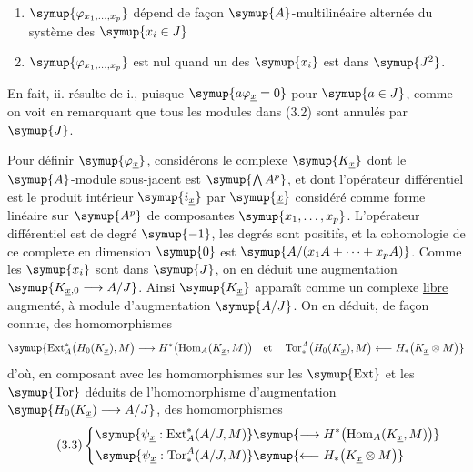 \begin{enumerate}
\item[\textup{i.}] $\symup{\varphi_{x_1,\ldots,x_p}}$ dépend de façon
$\symup{A}$-multilinéaire alternée du système des $\symup{x_i\in J}$
\item[\textup{ii.}] $\symup{\varphi_{x_1,\ldots,x_p}}$ est nul quand un des $\symup{x_i}$ est
dans $\symup{J^{2}}$.
\end{enumerate}
En fait, ii. résulte de i., puisque $\symup{a\varphi_{\underline{x}}=0}$ pour $\symup{a\in J}$,
comme on voit en remarquant que tous les modules dans (3.2) sont annulés par
$\symup{J}$.

Pour définir $\symup{\varphi_{\underline{x}}}$, considérons le complexe
$\symup{K_{\underline{x}}}$ dont le $\symup{A}$-module sous-jacent est $\symup{\bigwedge A^{p}}$, et
dont l'opérateur différentiel est le produit intérieur $\symup{i_{\underline{x}}}$ par
$\symup{\underline{x}}$ considéré comme forme linéaire sur $\symup{A^{p}}$ de composantes
$\symup{x_1,\ldots,x_p}$. L'opérateur différentiel est de degré $\symup{-1}$, les degrés sont
positifs, et la cohomologie de ce complexe en dimension $\symup{0}$ est
$\symup{A/(x_1A+\cdots+x_pA)}$. Comme les $\symup{x_i}$ sont dans $\symup{J}$, on en déduit une
augmentation $\symup{K_{\underline{x},0}\longrightarrow A/J}$. Ainsi
$\symup{K_{\underline{x}}}$ apparaît comme un complexe \uline{libre} augmenté, à module
d'augmentation $\symup{A/J}$. On en déduit, de façon connue, des homomorphismes
\[
\symup{\operatorname{Ext}_{A}^{*}\bigl(H_0(K_{\underline{x}}),M\bigr)
\longrightarrow
H^{*}\bigl(\operatorname{Hom}_{A}(K_{\underline{x}},M)\bigr)\quad\text{et}\quad
\operatorname{Tor}_{*}^{A}\bigl(H_0(K_{\underline{x}}),M\bigr)
\longleftarrow
H_{*}\bigl(K_{\underline{x}}\otimes M\bigr)}
\]
d'où, en composant avec les homomorphismes sur les $\symup{\operatorname{Ext}}$ et les
$\symup{\operatorname{Tor}}$ déduits de l'homomorphisme d'augmentation
$\symup{H_0(K_{\underline{x}})\longrightarrow A/J}$, des homomorphismes
\begin{equation}\tag{3.3}
\left\{
\begin{aligned}\symup{\psi_{\underline{x}}:
\operatorname{Ext}_{A}^{*}(A/J,M)}&\symup{\longrightarrow H^{*}\bigl(\operatorname{Hom}_{A}(K_{\underline{x}},M)\bigr)}\\\symup{\psi_{\underline{x}}:
\operatorname{Tor}_{*}^{A}(A/J,M)}&\symup{\longleftarrow H_{*}\bigl(K_{\underline{x}}\otimes M\bigr)}\end{aligned}
\right.
\end{equation}
